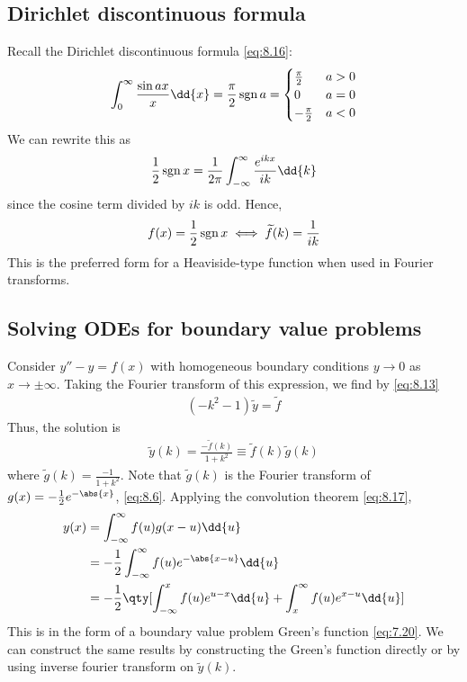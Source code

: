 \subsection{Dirichlet discontinuous formula}
Recall the Dirichlet discontinuous formula \cref{eq:8.16}:
\begin{align*}
	\int_0^\infty \frac{\sin ax}{x} \dd{x} = \frac{\pi}{2} \sgn a = \begin{cases}
		\frac{\pi}{2}  & a > 0 \\
		0              & a = 0 \\
		-\frac{\pi}{2} & a < 0
	\end{cases}
\end{align*}
We can rewrite this as
\begin{align*}
	\frac{1}{2} \sgn x = \frac{1}{2\pi} \int_{-\infty}^\infty \frac{e^{ikx}}{ik} \dd{k}
\end{align*}
since the cosine term divided by $ik$ is odd.
Hence,
\begin{align} \label{eq:8.26}
	f(x) = \frac{1}{2} \operatorname{sgn} x \iff \widetilde f(k) = \frac{1}{ik}
\end{align}
This is the preferred form for a Heaviside-type function when used in Fourier transforms.

\subsection{Solving ODEs for boundary value problems}
Consider $y'' - y = f(x)$ with homogeneous boundary conditions $y \to 0$ as $x \to \pm \infty$.
Taking the Fourier transform of this expression, we find by \cref{eq:8.13}
\begin{align*}
	(-k^2 - 1) \widetilde y = \widetilde f
\end{align*}
Thus, the solution is
\begin{align*}
	\widetilde y(k) = \frac{-\widetilde f(k)}{1+k^2} \equiv \widetilde f(k) \widetilde g(k)
\end{align*}
where $\widetilde g(k) = \frac{-1}{1 + k^2}$.
Note that $\widetilde g(k)$ is the Fourier transform of $g(x) = -\frac{1}{2} e^{-\abs{x}}$, \cref{eq:8.6}.
Applying the convolution theorem \cref{eq:8.17},
\begin{align*}
	y(x) &= \int_{-\infty}^\infty f(u) g(x-u) \dd{u} \\
	     &= -\frac{1}{2} \int_{-\infty}^\infty f(u) e^{-\abs{x-u}}\dd{u} \\
	     &= -\frac{1}{2} \qty[ \int_{-\infty}^x f(u) e^{u-x}\dd{u} + \int_x^\infty f(u) e^{x-u}\dd{u} ]
\end{align*}
This is in the form of a boundary value problem Green's function \cref{eq:7.20}.
We can construct the same results by constructing the Green's function directly or by using inverse fourier transform on $\widetilde y(k)$.

